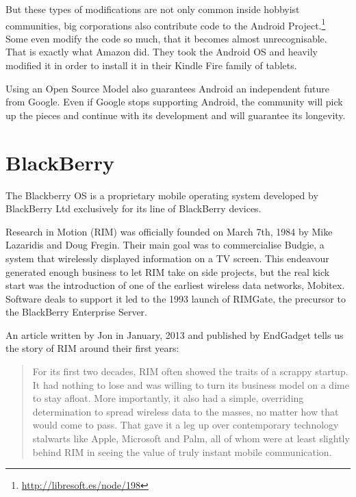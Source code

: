 But these types of modifications are not only common inside hobbyist communities, big corporations also contribute code to the Android Project.\footnote{\url{http://libresoft.es/node/198}} Some even modify the code so much, that it becomes almost unrecognisable. That is exactly what Amazon did. They took the Android \ac{OS} and heavily modified it in order to install it in their Kindle Fire family of tablets.


Using an Open Source Model also guarantees Android an independent future from Google. Even if Google stops supporting  Android, the community will pick up the pieces and continue with its development and will guarantee its longevity.

\section{BlackBerry}
The Blackberry \ac{OS} is a proprietary mobile operating system developed by BlackBerry Ltd exclusively for its line of BlackBerry devices.

Research in Motion (RIM) was officially founded on March 7th, 1984 by Mike Lazaridis and Doug Fregin. Their main goal was to commercialise Budgie, a system that wirelessly displayed information on a TV screen. This endeavour generated enough business to let RIM take on side projects, but the real kick start was the introduction of one of the earliest wireless data networks, Mobitex. Software deals to support it led to the 1993 launch of RIMGate, the precursor to the BlackBerry Enterprise Server.

An article written by Jon \citeauthor{fingas:2013} in January, 2013 and published by EndGadget tells us the story of RIM around their first years:

\begin{quotation}
For its first two decades, RIM often showed the traits of a scrappy startup. It had nothing to lose and was willing to turn its business model on a dime to stay afloat. More importantly, it also had a simple, overriding determination to spread wireless data to the masses, no matter how that would come to pass. That gave it a leg up over contemporary technology stalwarts like Apple, Microsoft and Palm, all of whom were at least slightly behind RIM in seeing the value of truly instant mobile communication.
\cite{fingas:2013}
\end{quotation}


